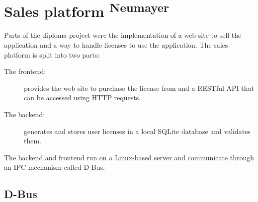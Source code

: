 \chapter{Sales platform \textsuperscript{Neumayer}}

Parts of the diploma project were the implementation of a web site to sell the application and a way to handle licenses to use the application. The sales platform is split into two parts:

\begin{description}
\item [The frontend:] provides the web site to purchase the license from and a RESTful API that can be accessed using HTTP requests. \hfill \\
\item [The backend:] generates and stores user licenses in a local SQLite database and validates them. \hfill \\
\end{description}

The backend and frontend run on a Linux-based server and communicate through an IPC mechanism called D-Bus.

\section{D-Bus}

